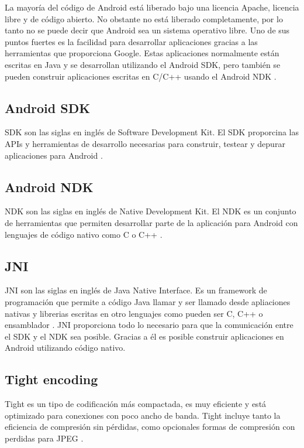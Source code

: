 La mayoría del código de Android está liberado bajo una licencia Apache, licencia libre y de código abierto. No obstante no está liberado completamente, por lo tanto no se puede decir que Android sea un sistema operativo libre. Uno de sus puntos fuertes es la facilidad para desarrollar aplicaciones gracias a las herramientas que proporciona Google. Estas aplicaciones normalmente están escritas en Java y se desarrollan utilizando el Android SDK, pero también se pueden construir aplicaciones escritas en C/C++ usando el Android NDK \cite{wiki:Android}.

\subsection{Android SDK}

SDK son las siglas en inglés de Software Development Kit. El SDK proporcina las APIs y herramientas de desarrollo necesarias para construir, testear y depurar aplicaciones para Android \cite{SDK:SDK}.

\subsection{Android NDK}

NDK son las siglas en inglés de Native Development Kit. El NDK es un conjunto de herramientas que permiten desarrollar parte de la aplicación para Android con lenguajes de código nativo como C o C++ \cite{NDK:NDK}.

\subsection{JNI}

JNI son las siglas en inglés de Java Native Interface. Es un framework de programación que permite a código Java llamar y ser llamado desde apliaciones nativas y librerias escritas en otro lenguajes como pueden ser C, C++ o ensamblador \cite{wiki:jni}. JNI proporciona todo lo necesario para que la comunicación entre el SDK y el NDK sea posible. Gracias a él es posible construir aplicaciones en Android utilizando código nativo.

\subsection{Tight encoding}

Tight es un tipo de codificación más compactada, es muy eficiente y está optimizado para conexiones con poco ancho de banda. Tight  incluye tanto la eficiencia de compresión sin pérdidas, como opcionales formas de compresión con perdidas para JPEG \cite{tightpage:tight}.

